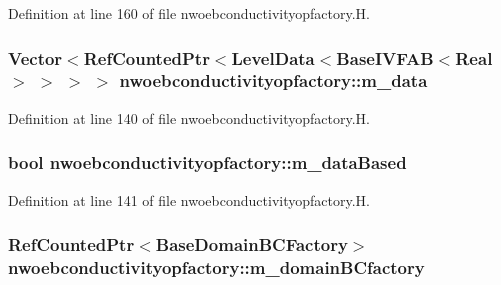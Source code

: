 Definition at line 160 of file nwoebconductivityopfactory.\+H.

\subsubsection[{\texorpdfstring{m\+\_\+data}{m_data}}]{\setlength{\rightskip}{0pt plus 5cm}Vector$<$Ref\+Counted\+Ptr$<$Level\+Data$<$Base\+I\+V\+F\+AB$<$Real$>$ $>$ $>$ $>$ nwoebconductivityopfactory\+::m\+\_\+data\hspace{0.3cm}{\ttfamily [protected]}}\hypertarget{classnwoebconductivityopfactory_af62c936e4d221df5407324c8a88b3941}{}\label{classnwoebconductivityopfactory_af62c936e4d221df5407324c8a88b3941}


Definition at line 140 of file nwoebconductivityopfactory.\+H.

\subsubsection[{\texorpdfstring{m\+\_\+data\+Based}{m_dataBased}}]{\setlength{\rightskip}{0pt plus 5cm}bool nwoebconductivityopfactory\+::m\+\_\+data\+Based\hspace{0.3cm}{\ttfamily [protected]}}\hypertarget{classnwoebconductivityopfactory_af795e17ac2401a1ac6faf3067b21166e}{}\label{classnwoebconductivityopfactory_af795e17ac2401a1ac6faf3067b21166e}


Definition at line 141 of file nwoebconductivityopfactory.\+H.

\subsubsection[{\texorpdfstring{m\+\_\+domain\+B\+Cfactory}{m_domainBCfactory}}]{\setlength{\rightskip}{0pt plus 5cm}Ref\+Counted\+Ptr$<$Base\+Domain\+B\+C\+Factory$>$ nwoebconductivityopfactory\+::m\+\_\+domain\+B\+Cfactory\hspace{0.3cm}{\ttfamily [protected]}}\hypertarget{classnwoebconductivityopfactory_a0c8345b7c0efb90885a93d1d03064add}{}\label{classnwoebconductivityopfactory_a0c8345b7c0efb90885a93d1d03064add}


